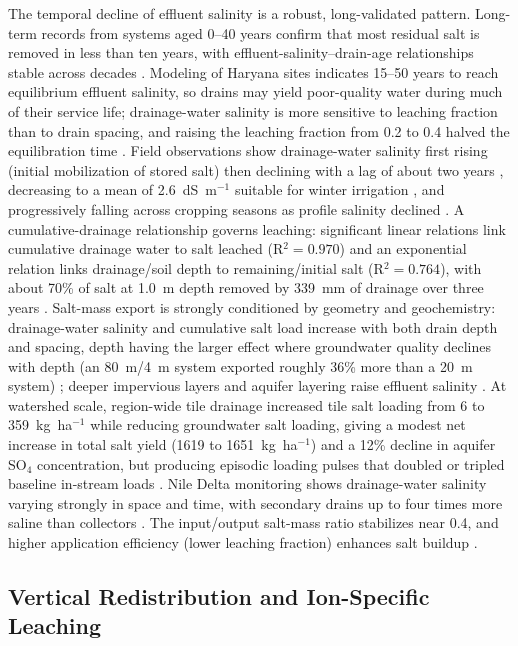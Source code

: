 \documentclass[11pt]{article}
\begin{document}
The temporal decline of effluent salinity is a robust, long-validated pattern. Long-term records from systems aged 0--40 years confirm that most residual salt is removed in less than ten years, with effluent-salinity--drain-age relationships stable across decades \parencite{JOHNSTON1993}. Modeling of Haryana sites indicates 15--50 years to reach equilibrium effluent salinity, so drains may yield poor-quality water during much of their service life; drainage-water salinity is more sensitive to leaching fraction than to drain spacing, and raising the leaching fraction from 0.2 to 0.4 halved the equilibration time \parencite{Kelleners2000}. Field observations show drainage-water salinity first rising (initial mobilization of stored salt) then declining with a lag of about two years \parencite{Manjunatha2004}, decreasing to a mean of 2.6~dS~m$^{-1}$ suitable for winter irrigation \parencite{Sharma2006}, and progressively falling across cropping seasons as profile salinity declined \parencite{Jayawardane2001}. A cumulative-drainage relationship governs leaching: significant linear relations link cumulative drainage water to salt leached (R$^2=0.970$) and an exponential relation links drainage/soil depth to remaining/initial salt (R$^2=0.764$), with about 70\% of salt at 1.0~m depth removed by 339~mm of drainage over three years \parencite{Bahçeci2009}. Salt-mass export is strongly conditioned by geometry and geochemistry: drainage-water salinity and cumulative salt load increase with both drain depth and spacing, depth having the larger effect where groundwater quality declines with depth (an 80~m/4~m system exported roughly 36\% more than a 20~m system) \parencite{GRISMER1993}; deeper impervious layers and aquifer layering raise effluent salinity \parencite{KAMRA1991,KAMRA1994}. At watershed scale, region-wide tile drainage increased tile salt loading from 6 to 359~kg~ha$^{-1}$ while reducing groundwater salt loading, giving a modest net increase in total salt yield (1619 to 1651~kg~ha$^{-1}$) and a 12\% decline in aquifer SO$_4$ concentration, but producing episodic loading pulses that doubled or tripled baseline in-stream loads \parencite{Addab2022}. Nile Delta monitoring shows drainage-water salinity varying strongly in space and time, with secondary drains up to four times more saline than collectors \parencite{ElAgha2020}. The input/output salt-mass ratio stabilizes near 0.4, and higher application efficiency (lower leaching fraction) enhances salt buildup \parencite{KARAJEH1994c}.

\subsection{Vertical Redistribution and Ion-Specific Leaching}
\end{document}

